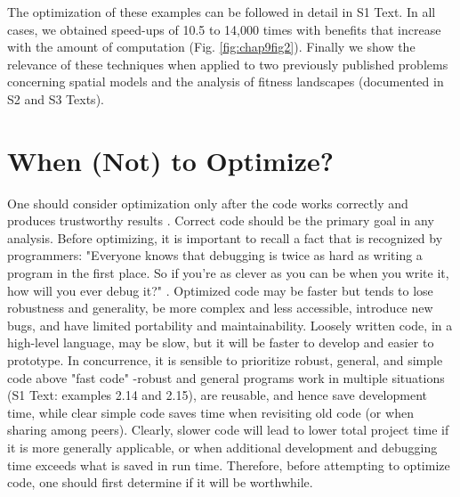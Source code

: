 \documentclass[b5paper,justified]{tufte-book} %
\begin{document}
\begin{fullwidth}
The optimization of these examples can be followed in detail in S1 Text. In all cases, we obtained speed-ups of 10.5 to 14,000 times with benefits that increase with the amount of computation (Fig. \ref{fig:chap9fig2}). Finally we show the relevance of these techniques when applied to two previously published problems concerning spatial models \citep{Merow2011} and the analysis of fitness landscapes \citep{Visser2011} (documented in S2 and S3 Texts).

\section{When (Not) to Optimize?}
One should consider optimization only after the code works correctly and produces trustworthy results \citep{Chambers2009}. Correct code should be the primary goal in any analysis. Before optimizing, it is important to recall a fact that is recognized by programmers: "Everyone knows that debugging is twice as hard as writing a program in the first place. So if you're as clever as you can be when you write it, how will you ever debug it?" \citep{Kernighan1978}. Optimized code may be faster but tends to lose robustness and generality, be more complex and less accessible, introduce new bugs, and have limited portability and maintainability. Loosely written code, in a high-level language, may be slow, but it will be faster to develop and easier to prototype. In concurrence, it is sensible to prioritize robust, general, and simple code above "fast code" -robust and general programs work in multiple situations (S1 Text: examples 2.14 and 2.15), are reusable, and hence save development time, while clear simple code saves time when revisiting old code (or when sharing among peers). Clearly, slower code will lead to lower total project time if it is more generally applicable, or when additional development and debugging time exceeds what is saved in run time. Therefore, before attempting to optimize code, one should first determine if it will be worthwhile.


\end{fullwidth}
\end{document}
